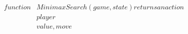 \documentclass[preview]{standalone}
\begin{document}
\begin{align*}
function &MinimaxSearch(game, state) returns an action \\&player \\& value, move
\end{align*}
\end{document}
